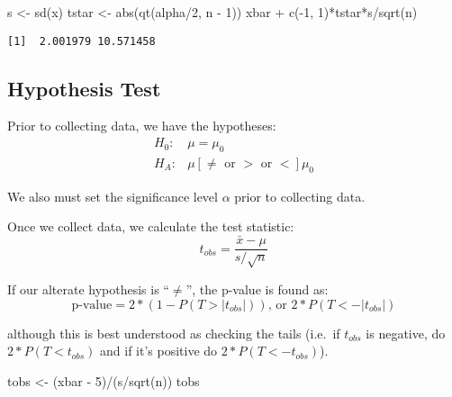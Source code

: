 \documentclass[
  letterpaper,
  DIV=11,
  numbers=noendperiod]{scrreprt}
\newenvironment{Shaded}{\begin{snugshade}}{\end{snugshade}}
\newcommand{\DecValTok}[1]{\textcolor[rgb]{0.68,0.00,0.00}{#1}}
\newcommand{\FunctionTok}[1]{\textcolor[rgb]{0.28,0.35,0.67}{#1}}
\newcommand{\NormalTok}[1]{\textcolor[rgb]{0.00,0.23,0.31}{#1}}
\newcommand{\OtherTok}[1]{\textcolor[rgb]{0.00,0.23,0.31}{#1}}
\newcommand{\SpecialCharTok}[1]{\textcolor[rgb]{0.37,0.37,0.37}{#1}}
\begin{document}
\begin{Shaded}
\begin{Highlighting}[]
\NormalTok{s }\OtherTok{\textless{}{-}} \FunctionTok{sd}\NormalTok{(x)}
\NormalTok{tstar }\OtherTok{\textless{}{-}} \FunctionTok{abs}\NormalTok{(}\FunctionTok{qt}\NormalTok{(alpha}\SpecialCharTok{/}\DecValTok{2}\NormalTok{, n }\SpecialCharTok{{-}} \DecValTok{1}\NormalTok{))}
\NormalTok{xbar }\SpecialCharTok{+} \FunctionTok{c}\NormalTok{(}\SpecialCharTok{{-}}\DecValTok{1}\NormalTok{, }\DecValTok{1}\NormalTok{)}\SpecialCharTok{*}\NormalTok{tstar}\SpecialCharTok{*}\NormalTok{s}\SpecialCharTok{/}\FunctionTok{sqrt}\NormalTok{(n)}
\end{Highlighting}
\end{Shaded}

\begin{verbatim}
[1]  2.001979 10.571458
\end{verbatim}

\hypertarget{hypothesis-test-1}{%
\subsection{Hypothesis Test}\label{hypothesis-test-1}}

Prior to collecting data, we have the hypotheses: \begin{align*}
H_0:&\mu = \mu_0\\
H_A:&\mu [\ne\text{ or }>\text{ or }<] \mu_0
\end{align*}

We also must set the significance level \(\alpha\) prior to collecting
data.

Once we collect data, we calculate the test statistic: \[
t_{obs} = \frac{\bar x - \mu}{s/\sqrt{n}}
\]

If our alterate hypothesis is ``\(\ne\)'', the p-value is found as: \[
\text{p-value} = 2*(1-P(T > |t_{obs}|))\text{, or } 2*P(T < -|t_{obs}|)
\]

although this is best understood as checking the tails (i.e.~if
\(t_{obs}\) is negative, do \(2*P(T < t_{obs})\) and if it's positive do
\(2*P(T < -t_{obs})\)).

\begin{Shaded}
\begin{Highlighting}[]
\NormalTok{tobs }\OtherTok{\textless{}{-}}\NormalTok{ (xbar }\SpecialCharTok{{-}} \DecValTok{5}\NormalTok{)}\SpecialCharTok{/}\NormalTok{(s}\SpecialCharTok{/}\FunctionTok{sqrt}\NormalTok{(n))}
\NormalTok{tobs}
\end{Highlighting}
\end{Shaded}
\end{document}
